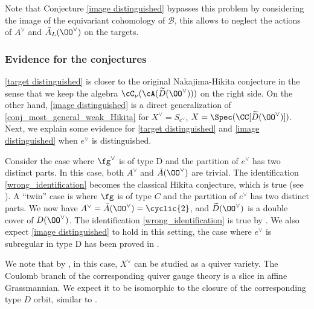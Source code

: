 \documentclass[12pt]{amsart}
\begin{document}
Note that Conjecture \ref{image distinguished} bypasses this problem by considering the image of the equivariant cohomology of $\mathcal{B}$, this allows to neglect the actions of $A^\vee$ and $\Bar{A}_{L}(\OO^\vee)$ on the targets.


\subsubsection{Evidence for the conjectures}
\cref{target distinguished} is closer to the original Nakajima-Hikita conjecture in the sense that we keep the algebra $\cC_\nu(\cA(\widetilde{D}(\OO^\vee)))$ on the right side. 
On the other hand, 
\cref{image distinguished} is a direct generalization of \cref{conj_most_general_weak_Hikita} for $X^\vee=S_{e^\vee}$, $X=\Spec(\CC[\widetilde{D}(\OO^\vee)])$. Next, we explain some evidence for \cref{target distinguished} and \cref{image distinguished} when $e^\vee$ is distinguished.

Consider the case where $\fg^\vee$ is of type D and the partition of $e^\vee$ has two distinct parts. In this case, both $A^\vee$ and $\Bar{A}(\OO^\vee)$ are trivial. The identification \ref{wrong_identification} becomes the classical Hikita conjecture, which is true (see \cite[Proposition 6.1]{hoang2}). A ``twin'' case is where $\fg$ is of type $C$ and the partition of $e^\vee$ has two distinct parts. We now have $A^\vee= \Bar{A}(\OO^\vee)= \cyclic{2}$, and $\widetilde{D}(\OO^\vee)$ is a double cover of ${D}(\OO^\vee)$. The identification \ref{wrong_identification} is true by \cite[Remark 5.5]{hoang2}. We also expect \cref{image distinguished} to hold in this setting, the case where $e^\vee$ is subregular in type D has been proved in \cite[Theorem 1.3]{chen2024}.

\begin{rmk}
    We note that by \cite{Henderson2014}, in this case, $X^\vee$ can be studied as a quiver variety. The Coulomb branch of the corresponding quiver gauge theory is a slice in affine Grassmannian. We expect it to be isomorphic to the closure of the corresponding type $D$ orbit, similar to \cite{Mirkovi2022}.
\end{rmk}



\end{document}
